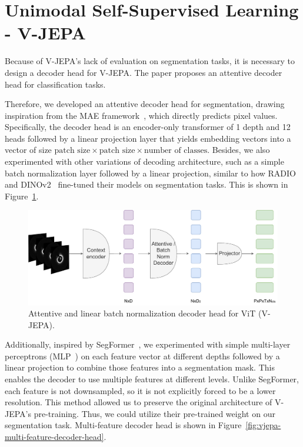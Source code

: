 \documentclass[a4paper,11pt,oneside]{report}
\begin{document}
\section{Unimodal Self-Supervised Learning - V-JEPA}\label{sec:implementation:vjepa}
Because of V-JEPA's lack of evaluation on segmentation tasks, it is necessary to design a decoder head for V-JEPA. The paper proposes an attentive decoder head for classification tasks. 

Therefore, we developed an attentive decoder head for segmentation, drawing inspiration from the MAE framework~\cite{He2022}, which directly predicts pixel values. Specifically, the decoder head is an encoder-only transformer of 1 depth and 12 heads followed by a linear projection layer that yields embedding vectors into a vector of size \(\text{patch size} \times \text{patch size} \times \text{number of classes}\). Besides, we also experimented with other variations of decoding architecture, such as a simple batch normalization layer followed by a linear projection, similar to how RADIO~\cite{Ranzinger2024RADIO} and DINOv2~\cite{Oquab2024dinov} fine-tuned their models on segmentation tasks. This is shown in Figure~\ref{fig:vjepa-attentive-and-batchnorm-decoder-head}. 

\begin{figure}[ht]
    \centering
    \includegraphics[width=0.6\linewidth]{figures/fig_implementation_vjepa_attentive_and_batchnorm_decoder.pdf}
    \caption{Attentive and linear batch normalization decoder head for ViT (V-JEPA).}
    \label{fig:vjepa-attentive-and-batchnorm-decoder-head}
\end{figure}%

Additionally, inspired by SegFormer~\cite{Xie2021SegFormer}, we experimented with simple multi-layer perceptrons (MLP~\cite{Rumelhart1986}) on each feature vector at different depths followed by a linear projection to combine those features into a segmentation mask. This enables the decoder to use multiple features at different levels. Unlike SegFormer, each feature is not downsampled, so it is not explicitly forced to be a lower resolution. This method allowed us to preserve the original architecture of V-JEPA's pre-training. Thus, we could utilize their pre-trained weight on our segmentation task. Multi-feature decoder head is shown in Figure~\ref{fig:vjepa-multi-feature-decoder-head}.
\end{document}
